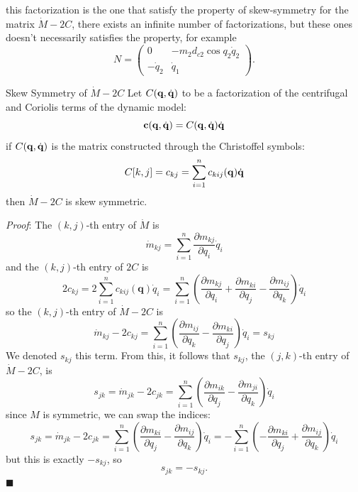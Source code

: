 \documentclass[10pt, a4paper]{report}
\newcommand{\q}{{\mathbf q}}
\begin{document}
this factorization is the one that satisfy the property of skew-symmetry for the matrix $\dot M-2C$, there exists an infinite number of factorizations, but these ones doesn't necessarily satisfies the property, for example\begin{equation}
    N=\begin{pmatrix}
        0&-m_2d_{c2}\cos q_2\dot q_2\\ 
        -\dot q_2&\dot q_1
    \end{pmatrix}.
\end{equation}
\begin{boxtheorem}{Skew Symmetry of $\dot M-2C$}{}
    Let $C(\q,\dq)$ to be a factorization of the centrifugal and Coriolis terms of the dynamic model: $$\mathbf c(\q,\dq) = C(\q,\dq)\dq $$
    if $C(\q,\dq)$ is the matrix constructed through the Christoffel symbols: 
    $$ C[k,j]=c_{kj}=\sum_{i=1}^{n}c_{kij}(\q)\dq$$
    then $\dot M-2C$ is skew symmetric.
\end{boxtheorem}
\noindent\textit{Proof}: The $(k,j)$-th entry of $\dot M$ is\begin{equation}
    \dot m_{kj}=\sum_{i=1}^{n}\frac{\partial m_{kj}}{\partial q_i}\dot q_i
\end{equation}
and the $(k,j)$-th entry of $2C$ is\begin{equation}
    2c_{kj}=2\sum_{i=1}^{n}c_{kij}(\q)\dot q_i=\sum_{i=1}^{n} \left( \frac{\partial m_{kj}}{\partial q_i} + \frac{\partial m_{ki}}{\partial q_j} - \frac{\partial m_{ij}}{\partial q_k} \right)\dot q_i
\end{equation}
so the $(k,j)$-th entry of $\dot M-2C$ is\begin{equation}
     \dot m_{kj}- 2c_{kj}=\sum_{i=1}^{n} \left(  \frac{\partial m_{ij}}{\partial q_k} - \frac{\partial m_{ki}}{\partial q_j} \right)\dot q_i = s_{kj}
\end{equation}
We denoted $s_{kj}$ this term. From this, it follows that $s_{kj}$, the $(j,k)$-th entry of $\dot M-2C$, is 
\begin{equation}
     s_{jk}=\dot m_{jk}- 2c_{jk}=\sum_{i=1}^{n} \left(  \frac{\partial m_{ik}}{\partial q_j} - \frac{\partial m_{ji}}{\partial q_k} \right)\dot q_i 
\end{equation}
since $M$ is symmetric, we can swap the indices:
\begin{equation}
     s_{jk}=\dot m_{jk}- 2c_{jk}=\sum_{i=1}^{n} \left(  \frac{\partial m_{ki}}{\partial q_j} - \frac{\partial m_{ij}}{\partial q_k} \right)\dot q_i = -\sum_{i=1}^{n} \left(-  \frac{\partial m_{ki}}{\partial q_j} + \frac{\partial m_{ij}}{\partial q_k} \right)\dot q_i
\end{equation}
but this is exactly $-s_{kj}$, so\begin{equation}
    s_{jk}=-s_{kj}.
\end{equation}
\hfill$\blacksquare$\bigskip
\end{document}

